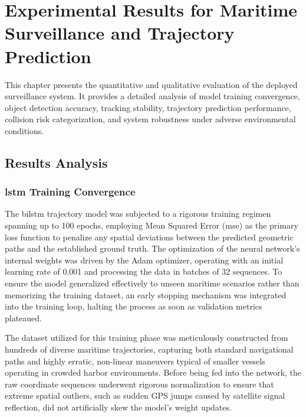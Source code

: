 \chapter{Experimental Results for Maritime Surveillance and Trajectory Prediction}

This chapter presents the quantitative and qualitative evaluation of the deployed surveillance system. It provides a detailed analysis of model training convergence, object detection accuracy, tracking stability, trajectory prediction performance, collision risk categorization, and system robustness under adverse environmental conditions.

\section{Results Analysis}


\subsection{\texorpdfstring{\gls{lstm}}{LSTM} Training Convergence}

The \gls{bilstm} trajectory model was subjected to a rigorous training regimen spanning up to 100 epochs, employing Mean Squared Error (\gls{mse}) as the primary loss function to penalize any spatial deviations between the predicted geometric paths and the established ground truth. The optimization of the neural network's internal weights was driven by the Adam optimizer, operating with an initial learning rate of 0.001 and processing the data in batches of 32 sequences. To ensure the model generalized effectively to unseen maritime scenarios rather than memorizing the training dataset, an early stopping mechanism was integrated into the training loop, halting the process as soon as validation metrics plateaued.

The dataset utilized for this training phase was meticulously constructed from hundreds of diverse maritime trajectories, capturing both standard navigational paths and highly erratic, non-linear maneuvers typical of smaller vessels operating in crowded harbor environments. Before being fed into the network, the raw coordinate sequences underwent rigorous normalization to ensure that extreme spatial outliers, such as sudden GPS jumps caused by satellite signal reflection, did not artificially skew the model's weight updates.

